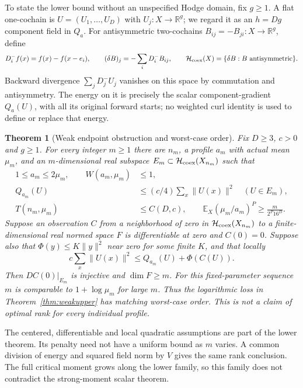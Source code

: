 \documentclass[11pt]{article}
\newtheorem{theorem}{Theorem}[section]
\newcommand{\R}{\mathbb R}
\newcommand{\Expect}{\mathbb E_X}
\begin{document}
To state the lower bound without an unspecified Hodge domain, fix $g\ge1$.
A flat one-cochain is $U=(U_1,\ldots,U_D)$ with $U_j:X\to\R^g$;
we regard it as an $h=Dg$ component field in $Q_a$.
For antisymmetric two-cochains $B_{ij}=-B_{ji}:X\to\R^g$, define
\begin{equation}\label{eq:coexact}
 D_i^-f(x)=f(x)-f(x-e_i),\qquad
 (\delta B)_j=-\sum_iD_i^-B_{ij},\qquad
 \mathcal H_{\rm coex}(X)=\{\delta B:B\text{ antisymmetric}\}.
\end{equation}
Backward divergence $\sum_jD_j^-U_j$ vanishes on this space by commutation
and antisymmetry. The energy on it is precisely the scalar component-gradient
$Q_a(U)$, with all its original forward starts; no weighted curl identity
is used to define or replace that energy.

\begin{theorem}[Weak endpoint obstruction and worst-case order]\label{thm:weaklower}
Fix $D\ge3$, $c>0$ and $g\ge1$. For every integer $m\ge1$ there are $n_m$,
a profile $a_m$ with actual mean $\mu_m$, and an $m$-dimensional real
subspace $E_m\subset\mathcal H_{\rm coex}(X_{n_m})$ such that
\begin{align}\label{eq:lower-data}
 1\le a_m\le2\mu_m,\qquad W(a_m,\mu_m)&\le1,\nonumber\\
 Q_{a_m}(U)&\le(c/4)\sum_x\|U(x)\|^2\quad(U\in E_m),\\
 T(n_m,\mu_m)&\le C(D,c),\qquad
 \Expect(\mu_m/a_m)^P\ge\frac{m}{2^P16^D}.\nonumber
\end{align}
Suppose an observation $C$ from a neighborhood of zero in
$\mathcal H_{\rm coex}(X_{n_m})$ to a finite-dimensional real normed space
$F$ is differentiable at zero and $C(0)=0$. Suppose also that
$\Phi(y)\le K\|y\|^2$ near zero for some finite $K$, and that locally
\begin{equation}\label{eq:local-coercive}
 c\sum_x\|U(x)\|^2\le Q_{a_m}(U)+\Phi(C(U)).
\end{equation}
Then $DC(0)|_{E_m}$ is injective and $\dim F\ge m$.
For this fixed-parameter sequence $m$ is comparable to $1+\log\mu_m$ for
large $m$. Thus the logarithmic loss in Theorem~\ref{thm:weakupper} has
matching worst-case order. This is not a claim of optimal rank for every
individual profile.
\end{theorem}

The centered, differentiable and local quadratic assumptions are part of
the lower theorem. Its penalty need not have a uniform bound as $m$ varies.
A common division of energy and squared field norm by $V$ gives the same
rank conclusion. The full critical moment grows along the lower family,
so this family does not contradict the strong-moment scalar theorem.
\end{document}
